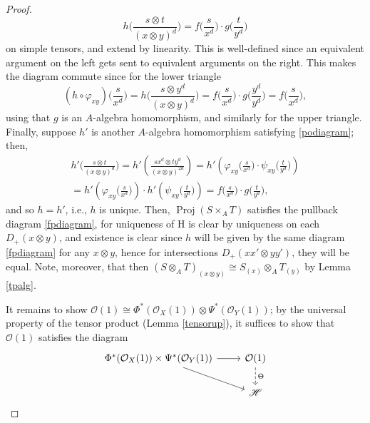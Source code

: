 \documentclass[12pt,letterpaper]{article}
\theoremstyle{definition}
\theoremstyle{remark}
\numberwithin{equation}{section}
\numberwithin{figure}{problem}
\DeclareMathOperator{\Proj}{Proj}
\newcommand{\HH}{\mathscr{H}}
\newcommand{\OO}{\mathcal{O}}
\begin{document}
\begin{proof}
\begin{equation}
    h\bigg( \frac{s \otimes t}{(x \otimes y)^d} \bigg) = f\bigg( \frac{s}{x^d} \bigg) \cdot g\bigg( \frac{t}{y^d} \bigg)
  \end{equation}
  on simple tensors, and extend by linearity. This is well-defined since an equivalent argument on the left gets sent to equivalent arguments on the right. This makes the diagram commute since for the lower triangle
  \begin{equation*}
    (h\circ\varphi_{xy})\bigg( \frac{s}{x^d} \bigg) = h\bigg( \frac{s \otimes y^d}{(x \otimes y)^d} \bigg) = f\bigg( \frac{s}{x^d} \bigg) \cdot g\bigg( \frac{y^d}{y^d} \bigg) = f\bigg( \frac{s}{x^d} \bigg),
  \end{equation*}
  using that $g$ is an $A$-algebra homomorphism, and similarly for the upper triangle. Finally, suppose $h'$ is another $A$-algebra homomorphism satisfying \eqref{podiagram}; then,
  \begin{multline*}
    h'\bigg( \frac{s \otimes t}{(x \otimes y)^d} \bigg) = h'\left( \frac{sx^d \otimes ty^d}{(x \otimes y)^{2d}} \right) = h'\left( \varphi_{xy}\bigg( \frac{s}{x^d} \bigg) \cdot \psi_{xy}\bigg( \frac{t}{y^d} \bigg) \right)\\
    = h'\left( \varphi_{xy}\bigg( \frac{s}{x^d} \bigg) \right) \cdot h'\left( \psi_{xy}\bigg( \frac{t}{y^d} \bigg) \right) = f\bigg( \frac{s}{x^d} \bigg) \cdot g\bigg( \frac{t}{y^d} \bigg),
  \end{multline*}
  and so $h = h'$, i.e., $h$ is unique. Then, $\Proj(S \times_A T)$ satisfies the pullback diagram \eqref{fpdiagram}, for uniqueness of $\mathrm{H}$ is clear by uniqueness on each $D_+(x \otimes y)$, and existence is clear since $h$ will be given by the same diagram \eqref{fpdiagram} for any $x \otimes y$, hence for intersections $D_+(xx' \otimes yy')$, they will be equal. Note, moreover, that then $(S \otimes_A T)_{(x \otimes y)} \cong S_{(x)} \otimes_A T_{(y)}$ by Lemma \ref{tpalg}.
  \par It remains to show $\OO(1) \cong \Phi^*(\OO_X(1)) \otimes \Psi^*(\OO_Y(1))$; by the universal property of the tensor product (Lemma \ref{tensorup}), it suffices to show that $\OO(1)$ satisfies the diagram
  \begin{equation}\label{p1p2tpdiagram}
    \begin{tikzcd}
      \Phi^*(\OO_X(1)) \times \Psi^*(\OO_Y(1)) \rar\arrow{dr} & \OO(1)\dar[dashed]{\Theta}\\
      & \HH
    \end{tikzcd}
  \end{equation}

\end{proof}
\end{document}
